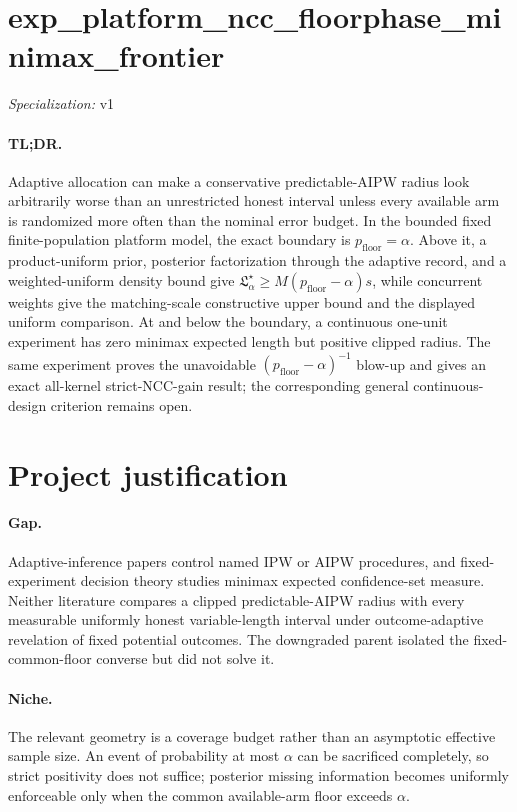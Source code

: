 \documentclass{article}
\begin{document}
\sloppy

\section*{exp\_\allowbreak{}platform\_\allowbreak{}ncc\_\allowbreak{}floorphase\_\allowbreak{}minimax\_\allowbreak{}frontier}

\noindent\textit{Specialization:} v1\par

\paragraph{TL;DR.} Adaptive allocation can make a conservative predictable-AIPW radius look arbitrarily worse than an unrestricted honest interval unless every available arm is randomized more often than the nominal error budget. In the bounded fixed finite-population platform model, the exact boundary is \(p_{\mathrm{floor}}=\alpha\). Above it, a product-uniform prior, posterior factorization through the adaptive record, and a weighted-uniform density bound give \(\mathfrak L_\alpha^\star\ge M(p_{\mathrm{floor}}-\alpha)s\), while concurrent weights give the matching-scale constructive upper bound and the displayed uniform comparison. At and below the boundary, a continuous one-unit experiment has zero minimax expected length but positive clipped radius. The same experiment proves the unavoidable \((p_{\mathrm{floor}}-\alpha)^{-1}\) blow-up and gives an exact all-kernel strict-NCC-gain result; the corresponding general continuous-design criterion remains open.

\section{Project justification}

\paragraph{Gap.} Adaptive-inference papers control named IPW or AIPW procedures, and fixed-experiment decision theory studies minimax expected confidence-set measure. Neither literature compares a clipped predictable-AIPW radius with every measurable uniformly honest variable-length interval under outcome-adaptive revelation of fixed potential outcomes. The downgraded parent isolated the fixed-common-floor converse but did not solve it.

\paragraph{Niche.} The relevant geometry is a coverage budget rather than an asymptotic effective sample size. An event of probability at most \(\alpha\) can be sacrificed completely, so strict positivity does not suffice; posterior missing information becomes uniformly enforceable only when the common available-arm floor exceeds \(\alpha\).
\end{document}
